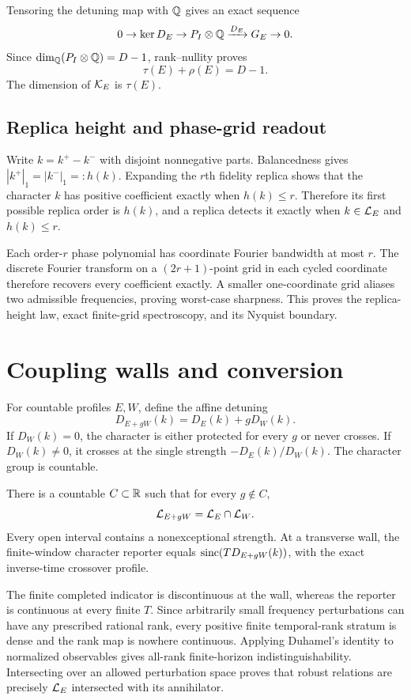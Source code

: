 Tensoring the detuning map with $\mathbb Q$ gives an exact sequence
\[
 0\to\ker D_E\to P_I\otimes\mathbb Q\xrightarrow{D_E}G_E\to0.
\]
Since $\dim_\mathbb Q(P_I\otimes\mathbb Q)=D-1$, rank--nullity proves
\[
 \tau(E)+\rho(E)=D-1.
\]
The dimension of $\mathcal K_E$ is $\tau(E)$.

\subsection{Replica height and phase-grid readout}

Write $k=k^+-k^-$ with disjoint nonnegative parts.  Balancedness gives
$|k^+|_1=|k^-|_1=:h(k)$.  Expanding the $r$th fidelity replica shows that
the character $k$ has positive coefficient exactly when $h(k)\le r$.
Therefore its first possible replica order is $h(k)$, and a replica detects
it exactly when $k\in\mathcal L_E$ and $h(k)\le r$.

Each order-$r$ phase polynomial has coordinate Fourier bandwidth at most
$r$.  The discrete Fourier transform on a $(2r+1)$-point grid in each
cycled coordinate therefore recovers every coefficient exactly.  A smaller
one-coordinate grid aliases two admissible frequencies, proving worst-case
sharpness.  This proves the replica-height law, exact finite-grid
spectroscopy, and its Nyquist boundary.

\section{Coupling walls and conversion}

For countable profiles $E,W$, define the affine detuning
\[
 D_{E+gW}(k)=D_E(k)+gD_W(k).
\]
If $D_W(k)=0$, the character is either protected for every $g$ or never
crosses.  If $D_W(k)\ne0$, it crosses at the single strength
$-D_E(k)/D_W(k)$.  The character group is countable.

\begin{theorem}
There is a countable $C\subset\mathbb R$ such that for every $g\notin C$,
\[
 \mathcal L_{E+gW}=\mathcal L_E\cap\mathcal L_W.
\]
Every open interval contains a nonexceptional strength.  At a transverse
wall, the finite-window character reporter equals
$\operatorname{sinc}(TD_{E+gW}(k))$, with the exact inverse-time crossover profile.
\end{theorem}

The finite completed indicator is discontinuous at the wall, whereas the
reporter is continuous at every finite $T$.  Since arbitrarily small
frequency perturbations can have any prescribed rational rank, every
positive finite temporal-rank stratum is dense and the rank map is nowhere
continuous.  Applying Duhamel's identity to normalized observables gives
all-rank finite-horizon indistinguishability.  Intersecting over an allowed
perturbation space proves that robust relations are precisely
$\mathcal L_E$ intersected with its annihilator.

